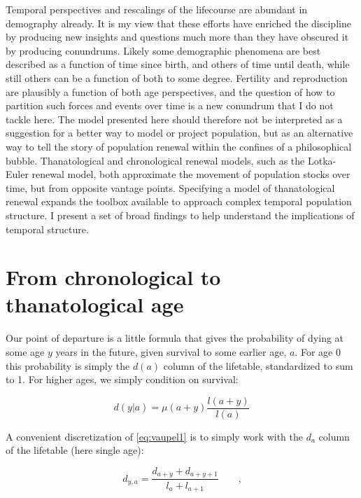 \documentclass{article}
\begin{document}
Temporal perspectives and rescalings of the lifecourse are abundant in
demography already. It is my view that these efforts have enriched the
discipline by producing new insights and questions much more than they have obscured it by
producing conundrums. Likely some demographic phenomena are best
described as a function of time since birth, and others of time until death,
while still others can be a function of both to some degree. Fertility and
reproduction are plausibly a function of both age perspectives, and the question
of how to partition such forces and events over time is a new conundrum that I
do not tackle here. The model presented here should therefore not be interpreted
as a suggestion for a better way to model or project population, but as an alternative way to tell the
story of population renewal within the confines of a philosophical bubble.
Thanatological and chronological renewal models, such as the Lotka-Euler renewal model, both approximate the movement of population stocks over time, but from opposite vantage points. Specifying a model of thanatological renewal expands the toolbox available to approach complex temporal population structure. I present a set of broad findings to help understand the implications of temporal structure.

\section*{From chronological to thanatological age}

Our point of departure is a little formula that gives the probability of
dying at some age $y$ years in the future, given survival to some
earlier age, $a$. For age 0 this probability is simply the $d(a)$
column of the lifetable, standardized to sum to 1. For higher ages, we simply condition on survival:

\begin{equation}
\label{eq:vaupel1}
d(y | a) = \mu(a+y)\frac{l(a+y)}{l(a)}
\end{equation}

A convenient discretization of \eqref{eq:vaupel1} is to simply work with the
$d_a$ column of the lifetable (here single age):

\begin{equation}
d_{y, a} =  \frac{d_{a+y}+d_{a+y+1}}{l_a + l_{a+1}} \quad\quad \text{,}
\end{equation}
\end{document}
